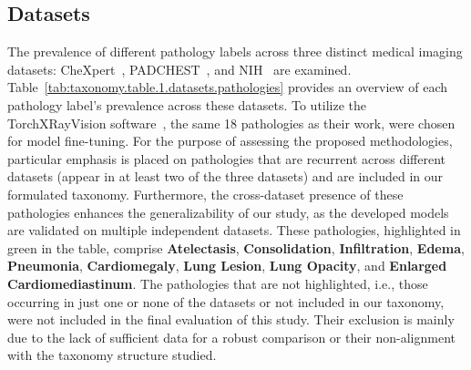 \documentclass[final,1p,times,authoryear]{elsarticle}
\begin{document}
\subsection{Datasets}
The prevalence of different pathology labels across three distinct medical imaging datasets: CheXpert~\cite{irvin_CheXpert_2019}, PADCHEST~\cite{bustos_Padchest_2020}, and NIH~\cite{wang_ChestXRay8_2017} are examined. Table~\ref{tab:taxonomy.table.1.datasets.pathologies} provides an overview of each pathology label's prevalence across these datasets. To utilize the TorchXRayVision software~\cite{cohen_TorchXRayVision_2022}, the same 18 pathologies as their work, were chosen for model fine-tuning. For the purpose of assessing the proposed methodologies, particular emphasis is placed on pathologies that are recurrent across different datasets (appear in at least two of the three datasets) and are included in our formulated taxonomy. Furthermore, the cross-dataset presence of these pathologies enhances the generalizability of our study, as the developed models are validated on multiple independent datasets. These pathologies, highlighted in \colorbox{mygreen}{green} in the table, comprise \textbf{Atelectasis}, \textbf{Consolidation}, \textbf{Infiltration}, \textbf{Edema}, \textbf{Pneumonia}, \textbf{Cardiomegaly}, \textbf{Lung Lesion}, \textbf{Lung Opacity}, and \textbf{Enlarged Cardiomediastinum}. The pathologies that are not highlighted, i.e., those occurring in just one or none of the datasets or not included in our taxonomy, were not included in the final evaluation of this study. Their exclusion is mainly due to the lack of sufficient data for a robust comparison or their non-alignment with the taxonomy structure studied.
\end{document}
